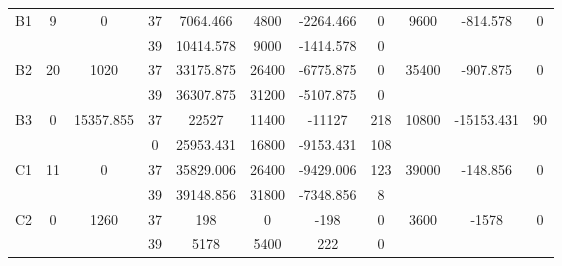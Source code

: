 \begin{sidewaystable}
\begin{tabular}{c||c|c||c|c|c|c|c||c|c|c}
         &
        
      \\
      \hline
      \multirow{2}{*}{B1} &
      \multirow{2}{*}{9} &
      \multirow{2}{*}{0} &
      37 &
      7064.466 &
      4800 &
        -2264.466 &
        0 &
      \multirow{2}{*}{9600} &
        \multirow{2}{*}{-814.578} &
        \multirow{2}{*}{0}
      \\
      \cline{4-8}
       &
       &
       &
      39 &
      10414.578 &
      9000 &
        -1414.578 &
        0 &
      
         &
        
      \\
      \hline
      \multirow{2}{*}{B2} &
      \multirow{2}{*}{20} &
      \multirow{2}{*}{1020} &
      37 &
      33175.875 &
      26400 &
        -6775.875 &
        0 &
      \multirow{2}{*}{35400} &
        \multirow{2}{*}{-907.875} &
        \multirow{2}{*}{0}
      \\
      \cline{4-8}
       &
       &
       &
      39 &
      36307.875 &
      31200 &
        -5107.875 &
        0 &
      
         &
        
      \\
      \hline
      \multirow{2}{*}{B3} &
      \multirow{2}{*}{0} &
      \multirow{2}{*}{15357.855} &
      37 &
      22527 &
      11400 &
        -11127 &
        218 &
      \multirow{2}{*}{10800} &
        \multirow{2}{*}{-15153.431} &
        \multirow{2}{*}{90}
      \\
      \cline{4-8}
       &
       &
       &
      0 &
      25953.431 &
      16800 &
        -9153.431 &
        108 &
      
         &
        
      \\
      \hline
      \multirow{2}{*}{C1} &
      \multirow{2}{*}{11} &
      \multirow{2}{*}{0} &
      37 &
      35829.006 &
      26400 &
        -9429.006 &
        123 &
      \multirow{2}{*}{39000} &
        \multirow{2}{*}{-148.856} &
        \multirow{2}{*}{0}
      \\
      \cline{4-8}
       &
       &
       &
      39 &
      39148.856 &
      31800 &
        -7348.856 &
        8 &
      
         &
        
      \\
      \hline
      \multirow{2}{*}{C2} &
      \multirow{2}{*}{0} &
      \multirow{2}{*}{1260} &
      37 &
      198 &
      0 &
        -198 &
        0 &
      \multirow{2}{*}{3600} &
        \multirow{2}{*}{-1578} &
        \multirow{2}{*}{0}
      \\
      \cline{4-8}
       &
       &
       &
      39 &
      5178 &
      5400 &
        222 &
        0 &
      

\end{tabular}
\end{sidewaystable}
